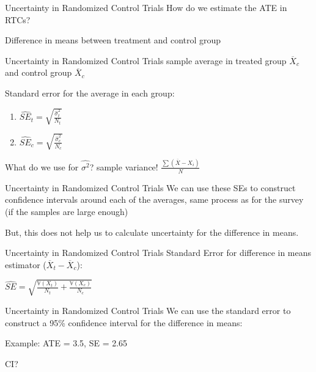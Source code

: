 \documentclass[presentation]{beamer}
\newcommand{\V}{\mathbb{V}}
\begin{document}
\begin{frame}[label={sec:orgb157cc9}]{Uncertainty in Randomized Control Trials}
How do we estimate the ATE in RTCs?

\pause

Difference in means between treatment and control group
\end{frame}

\begin{frame}[label={sec:org0696e8e}]{Uncertainty in Randomized Control Trials}
sample average in treated group \(\overline{X}_{c}\) and control group \(\overline{X}_{c}\)

\pause


Standard error for the average in each group:
\begin{enumerate}
\item \(\hat{SE}_{t} = \sqrt{\frac{\hat{\sigma}^{2}_{t}}{N_{t}}}\)
\item \(\hat{SE}_{c} = \sqrt{\frac{\hat{\sigma}^{2}_{c}}{N_{c}}}\)
\end{enumerate}

What do we use for \(\hat{\sigma^{2}}\)?
\pause
sample variance! \(\frac{\sum (\overline{X} - X_{i})}{N}\)
\end{frame}

\begin{frame}[label={sec:orgfdead10}]{Uncertainty in Randomized Control Trials}
We can use these SEs to construct confidence intervals around each of the averages, same process as for the survey (\alert{if the samples are large enough})

But, this does not help us to calculate uncertainty for the difference in means.
\end{frame}


\begin{frame}[label={sec:org6263dfe}]{Uncertainty in Randomized Control Trials}
Standard Error for difference in means estimator (\(\overline{X}_{t} - \overline{X}_{c}\)):

\(\hat{SE} = \sqrt{\frac{\V(X_{t})}{N_{t}} + \frac{\V(X_{c})}{N_{c}}}\)
\end{frame}

\begin{frame}[label={sec:org57c1333}]{Uncertainty in Randomized Control Trials}
We can use the standard error to construct a 95\% confidence interval for the difference in means:

Example: ATE = 3.5, SE = 2.65

CI?
\end{frame}
\end{document}
